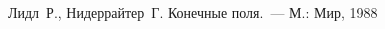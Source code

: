 \clearpage
\begin{thebibliography}{9}

Лидл~Р., Нидеррайтер~Г. Конечные поля.~--- М.: Мир, 1988
\end{thebibliography}

\clearpage
